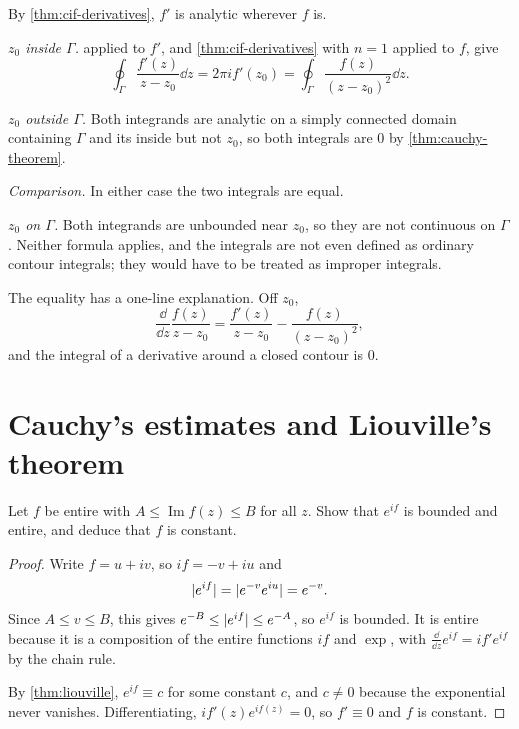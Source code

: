 \begin{solution}
  By \cref{thm:cif-derivatives}, $f'$ is analytic wherever $f$ is.

  \emph{$z_0$ inside $\Gamma$.}  applied to $f'$, and
  \cref{thm:cif-derivatives} with $n = 1$ applied to $f$, give
  \[
    \oint_\Gamma \frac{f'(z)}{z - z_0} \dd z = 2\pi i f'(z_0)
    = \oint_\Gamma \frac{f(z)}{(z - z_0)^2} \dd z.
  \]

  \emph{$z_0$ outside $\Gamma$.} Both integrands are analytic on a simply
  connected domain containing $\Gamma$ and its inside but not $z_0$, so both
  integrals are $0$ by \cref{thm:cauchy-theorem}.

  \emph{Comparison.} In either case the two integrals are equal.

  \emph{$z_0$ on $\Gamma$.} Both integrands are unbounded near $z_0$, so they
  are not continuous on $\Gamma$. Neither formula applies, and the integrals
  are not even defined as ordinary contour integrals; they would have to be
  treated as improper integrals.
\end{solution}

\begin{remark}
  The equality has a one-line explanation. Off $z_0$,
  \[
    \frac{\dd}{\dd z} \frac{f(z)}{z - z_0}
    = \frac{f'(z)}{z - z_0} - \frac{f(z)}{(z - z_0)^2},
  \]
  and the integral of a derivative around a closed contour is $0$.
\end{remark}

\section{Cauchy's estimates and Liouville's theorem}\label{sec:liouville}




\begin{exercise}\label{ex:bounded-imaginary-part}
  Let $f$ be entire with $A \leq \operatorname{Im} f(z) \leq B$ for all $z$.
  Show that $e^{if}$ is bounded and entire, and deduce that $f$ is constant.
\end{exercise}

\begin{proof}
  Write $f = u + iv$, so $if = -v + iu$ and
  \[
    \lvert e^{if}\rvert = \lvert e^{-v} e^{iu}\rvert = e^{-v}.
  \]
  Since $A \leq v \leq B$, this gives $e^{-B} \leq \lvert e^{if}\rvert \leq e^{-A}$,
  so $e^{if}$ is bounded. It is entire because it is a composition of the
  entire functions $if$ and $\exp$, with
  $\frac{\dd}{\dd z} e^{if} = if' e^{if}$ by the chain rule.

  By \cref{thm:liouville}, $e^{if} \equiv c$ for some constant $c$, and
  $c \neq 0$ because the exponential never vanishes. Differentiating,
  $if'(z) e^{if(z)} = 0$, so $f' \equiv 0$ and $f$ is constant.
\end{proof}

